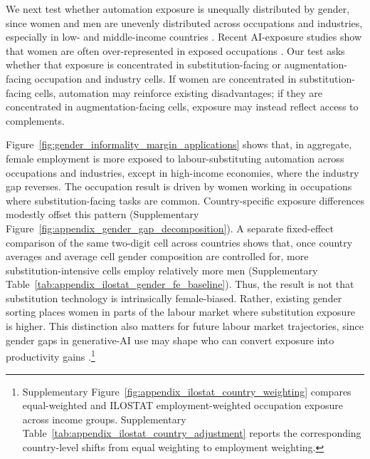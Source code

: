 \documentclass[11pt]{article}
\begin{document}
We next test whether automation exposure is unequally distributed by gender, since women and men are unevenly distributed across occupations and industries, especially in low- and middle-income countries \citep{BorrowmanKlasen2020}. Recent AI-exposure studies show that women are often over-represented in exposed occupations \citep{GmyrekBergBescond2023,GmyrekEtAl2025,CazzanigaPantonLiPizzinelliTavares2025GenderLens,AlbanesiDiasDaSilvaJimenoLamoWabitsch2025WomenAI,Lane2024WorkersAffectedAI,WilliamsonEtAl2025IrelandAIComplementarity}. Our test asks whether that exposure is concentrated in substitution-facing or augmentation-facing occupation and industry cells. If women are concentrated in substitution-facing cells, automation may reinforce existing disadvantages; if they are concentrated in augmentation-facing cells, exposure may instead reflect access to complements.

Figure~\ref{fig:gender_informality_margin_applications} shows that, in aggregate, female employment is more exposed to labour-substituting automation across occupations and industries, except in high-income economies, where the industry gap reverses. The occupation result is driven by women working in occupations where substitution-facing tasks are common. Country-specific exposure differences modestly offset this pattern (Supplementary Figure~\ref{fig:appendix_gender_gap_decomposition}). A separate fixed-effect comparison of the same two-digit cell across countries shows that, once country averages and average cell gender composition are controlled for, more substitution-intensive cells employ relatively more men (Supplementary Table~\ref{tab:appendix_ilostat_gender_fe_baseline}). Thus, the result is not that substitution technology is intrinsically female-biased. Rather, existing gender sorting places women in parts of the labour market where substitution exposure is higher. This distinction also matters for future labour market trajectories, since gender gaps in generative-AI use may shape who can convert exposure into productivity gains \citep{CranneyDelecourtKoning2026GenderGapsGenAI}.\footnote{Supplementary Figure~\ref{fig:appendix_ilostat_country_weighting} compares equal-weighted and ILOSTAT employment-weighted occupation exposure across income groups. Supplementary Table~\ref{tab:appendix_ilostat_country_adjustment} reports the corresponding country-level shifts from equal weighting to employment weighting.}
\end{document}
